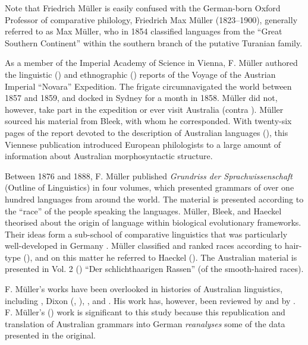 Note that Friedrich Müller is easily confused with the German-born Oxford Professor of comparative philology, Friedrich Max Müller (1823--1900), generally referred to as Max Müller, who in 1854 \citep[158]{muller_letters_1854} classified languages from the “Great Southern Continent” within the southern branch of the putative Turanian family. 

As a member of the Imperial Academy of Science in Vienna, F. Müller authored the linguistic (\citeyear{muller_reise_1867}) and ethnographic (\citeyear{muller_reise_1868}) reports of the Voyage of the Austrian Imperial “Novara” Expedition. The frigate circumnavigated the world between 1857 and 1859, and docked in Sydney for a month in 1858. Müller did not, however, take part in the expedition or ever visit Australia (contra \citealt[367]{newton_more_1987}). Müller sourced his material from Bleek, with whom he corresponded. With twenty-six pages of the report devoted to the description of Australian languages (\citeyear[241--66]{muller_reise_1867}), this Viennese publication introduced European philologists to a large amount of information about Australian morphosyntactic structure.

Between 1876 and 1888, F. Müller published \textit{Grundriss der Sprachwissenschaft} (Outline of Linguistics) in four volumes, which presented grammars of over one hundred languages from around the world. The material is presented according to the ``race'' of the people speaking the languages. Müller, Bleek, and Haeckel theorised about the origin of language within biological evolutionary frameworks. Their ideas form a sub-school of comparative linguistics that was particularly well-developed in Germany \citep{gregorio_reflections_2002}. Müller classified and ranked races according to hair-type (\citeyear[24]{muller_18761887_nodate}), and on this matter he referred to Haeckel (\citeyear[72--73]{haeckel_history_1876}). The Australian material is presented in Vol. 2 (\citeyear[1--98]{muller_grundris_1882}) “Der schlichthaarigen Rassen” (of the smooth-haired races).

F. Müller’s works have been overlooked in histories of Australian linguistics, including \citet{elkin_nature_1937}, Dixon (\citeyear[8--17]{dixon_languages_1980}, \citeyear{dixon_australian_2002}), \citet{koch_methodological_2004}, and \citet{mcgregor_introduction_2008}. His work has, however, been reviewed by \citet[2]{ray_aboriginal_1925} and by \citet[366--367]{newton_more_1987}. F. Müller’s (\citeyear{muller_grundris_1882}) work is significant to this study because this republication and translation of Australian grammars into German \textit{reanalyses} some of the data presented in the original. 

